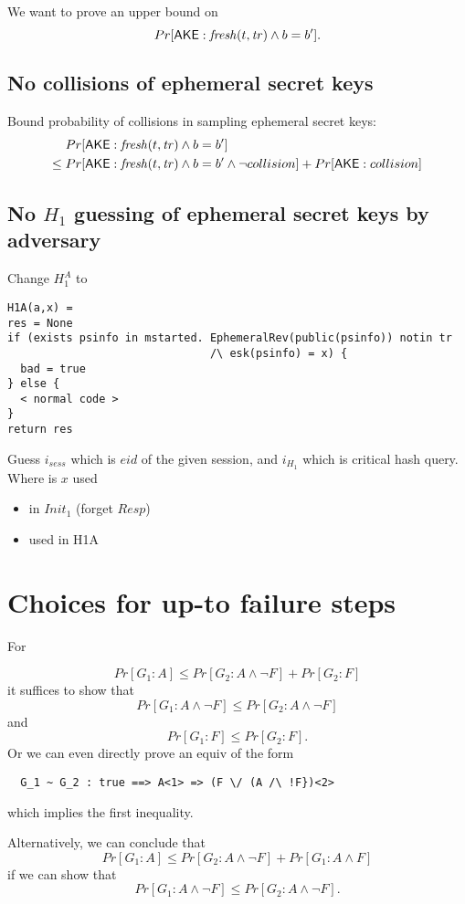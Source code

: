 \documentclass[]{article}
\begin{document}
We want to prove an upper bound on
\[
  Pr[\mathsf{AKE} : \mathit{fresh}(t, \mathit{tr}) \land b = b'].
\]

\subsection{No collisions of ephemeral secret keys}

Bound probability of collisions in sampling ephemeral secret keys:
\begin{align*}
  & Pr[\mathsf{AKE} : \mathit{fresh}(t, \mathit{tr}) \land b = b'] \\
  \leq{}&   Pr[\mathsf{AKE} : \mathit{fresh}(t, \mathit{tr}) \land b = b' \land \neg collision]
          + Pr[\mathsf{AKE} : collision]
\end{align*}


\subsection{No $H_1$ guessing of ephemeral secret keys by adversary}

Change $H_1^A$ to

\begin{verbatim}
H1A(a,x) =
res = None
if (exists psinfo in mstarted. EphemeralRev(public(psinfo)) notin tr
                               /\ esk(psinfo) = x) {
  bad = true
} else {
  < normal code >
}
return res
\end{verbatim}
%
Guess $i_{sess}$ which is $eid$ of the given session, and $i_{H_1}$ which is critical
  hash query.
%
Where is $x$ used
\begin{itemize}
\item in $Init_1$ (forget $Resp$)
\item used in H1A
\end{itemize}

\section{Choices for up-to failure steps}

For

\[
  Pr[G_1 : A] \leq Pr[G_2 : A \land \neg F] + Pr[G_2 : F]
\]
%
it suffices to show that
\[
  Pr[G_1 : A \land \neg F] \leq Pr[G_2 : A \land \neg F]
\]
and
 \[
   Pr[G_1 : F] \leq Pr[G_2 : F].
 \]
%
Or we can even directly prove an equiv of the form
\begin{verbatim}
  G_1 ~ G_2 : true ==> A<1> => (F \/ (A /\ !F})<2>
\end{verbatim}
which implies the first inequality.

Alternatively, we can conclude that
\[
  Pr[G_1 : A] \leq Pr[G_2 : A \land \neg F] + Pr[G_1 : A \land F]
\]
%
if we can show that
\[
  Pr[G_1 : A \land \neg F] \leq Pr[G_2 : A \land \neg F].
\]
\end{document}
